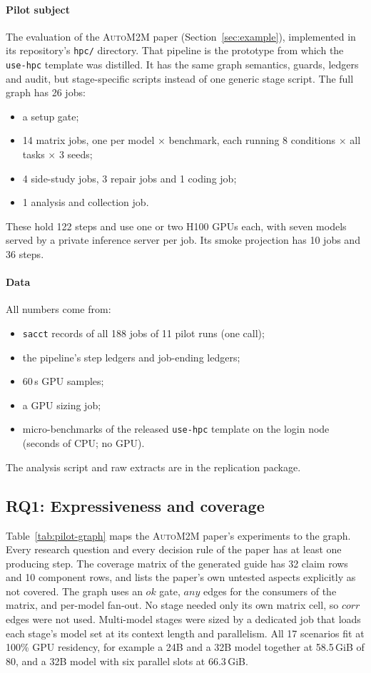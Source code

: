 \documentclass[pdflatex,sn-mathphys-num]{sn-jnl}
\theoremstyle{thmstyleone}%
\theoremstyle{thmstyletwo}%
\theoremstyle{thmstylethree}%
\newcommand{\skill}{\texttt{use-hpc}}
\newcommand{\auto}{\textsc{AutoM2M}}
\newcommand{\code}[1]{\texttt{#1}}
\begin{document}
\paragraph{Pilot subject} The evaluation of the \auto{} paper
(Section~\ref{sec:example}), implemented in its repository's \code{hpc/}
directory. That pipeline is the prototype from which the \skill{} template was
distilled. It has the same graph semantics, guards, ledgers and audit, but
stage-specific scripts instead of one generic stage script. The full graph has
26 jobs:
\begin{itemize}[leftmargin=1.4em, itemsep=1pt]
\item a setup gate;
\item 14 matrix jobs, one per model $\times$ benchmark, each running 8
conditions $\times$ all tasks $\times$ 3 seeds;
\item 4 side-study jobs, 3 repair jobs and 1 coding job;
\item 1 analysis and collection job.
\end{itemize}
These hold 122 steps and use one or two H100 GPUs each, with seven models
served by a private inference server per job. Its smoke projection has 10 jobs
and 36 steps.

\paragraph{Data} All numbers come from:
\begin{itemize}[leftmargin=1.4em, itemsep=1pt]
\item \code{sacct} records of all 188 jobs of 11 pilot runs (one call);
\item the pipeline's step ledgers and job-ending ledgers;
\item 60\,s GPU samples;
\item a GPU sizing job;
\item micro-benchmarks of the released \skill{} template on the login node
(seconds of CPU; no GPU).
\end{itemize}
The analysis script and raw extracts are in the replication package.

\subsection{RQ1: Expressiveness and coverage}\label{sec:res-rq1}

Table~\ref{tab:pilot-graph} maps the \auto{} paper's experiments to the graph.
Every research question and every decision rule of the paper has at least one
producing step. The coverage matrix of the generated guide has 32 claim rows
and 10 component rows, and lists the paper's own untested aspects explicitly
as not covered. The graph uses an $\mathit{ok}$ gate, $\mathit{any}$ edges for
the consumers of the matrix, and per-model fan-out. No stage needed only its
own matrix cell, so $\mathit{corr}$ edges were not used. Multi-model stages
were sized by a dedicated job that loads each stage's model set at its context
length and parallelism. All 17 scenarios
fit at 100\% GPU residency, for example a 24B and a 32B model together at
58.5\,GiB of 80, and a 32B model with six parallel slots at 66.3\,GiB.
\end{document}
